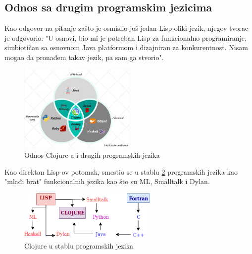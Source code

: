 \subsection{Odnos sa drugim programskim jezicima}
\label{subsec:drugijezici}

Kao odgovor na pitanje zašto je osmislio još jedan Lisp-oliki jezik, njegov tvorac je odgovorio: "U osnovi, bio mi je potreban Lisp za funkcionalno programiranje, simbiotičan sa osnovnom Java platformom i dizajniran za konkurentnost. Nisam mogao da pronađem takav jezik, pa sam ga stvorio"\cite{clojure}.


 \begin{figure}[h]
     \centering
     \includegraphics[width=0.5\textwidth]{Slike/clojure.png}
     \caption{Odnos Clojure-a i drugih programskih jezika}
     \label{fig:clojure_ostali}
 \end{figure}

Kao direktan Lisp-ov potomak, smestio se u stablu \ref{fig:stablo} programskih jezika  kao "mlađi brat" funkcionalnih jezika kao što su ML, Smalltalk i Dylan.

\begin{figure}[ht]
    \includegraphics[width=0.6\textwidth]{Slike/stablo2.png}
    \centering
    \caption{Clojure u stablu programskih jezika}
    \label{fig:stablo}
\end{figure}
